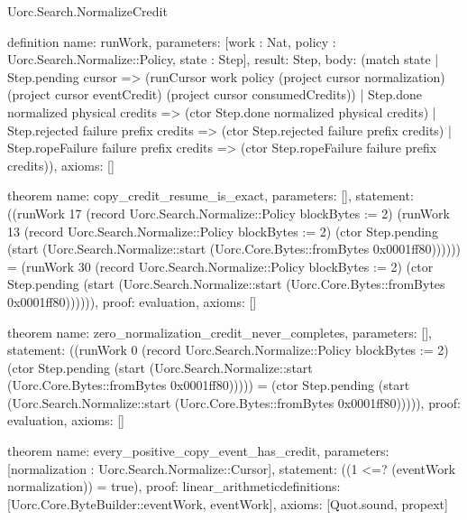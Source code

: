 \begin{lexlean}{Uorc.Search.NormalizeCredit}
\begin{semanticmodule}
definition{
  name: runWork,
  parameters: [work : Nat, policy : Uorc.Search.Normalize::Policy, state : Step],
  result: Step,
  body: (match state
    | Step.pending cursor => (runCursor work policy (project cursor normalization) (project cursor eventCredit) (project cursor consumedCredits))
    | Step.done normalized physical credits => (ctor Step.done normalized physical credits)
    | Step.rejected failure prefix credits => (ctor Step.rejected failure prefix credits)
    | Step.ropeFailure failure prefix credits => (ctor Step.ropeFailure failure prefix credits)),
  axioms: []
}

theorem{
  name: copy_credit_resume_is_exact,
  parameters: [],
  statement: ((runWork 17 (record Uorc.Search.Normalize::Policy {blockBytes := 2}) (runWork 13 (record Uorc.Search.Normalize::Policy {blockBytes := 2}) (ctor Step.pending (start (Uorc.Search.Normalize::start (Uorc.Core.Bytes::fromBytes 0x0001ff80)))))) = (runWork 30 (record Uorc.Search.Normalize::Policy {blockBytes := 2}) (ctor Step.pending (start (Uorc.Search.Normalize::start (Uorc.Core.Bytes::fromBytes 0x0001ff80)))))),
  proof: evaluation{},
  axioms: []
}

theorem{
  name: zero_normalization_credit_never_completes,
  parameters: [],
  statement: ((runWork 0 (record Uorc.Search.Normalize::Policy {blockBytes := 2}) (ctor Step.pending (start (Uorc.Search.Normalize::start (Uorc.Core.Bytes::fromBytes 0x0001ff80))))) = (ctor Step.pending (start (Uorc.Search.Normalize::start (Uorc.Core.Bytes::fromBytes 0x0001ff80))))),
  proof: evaluation{},
  axioms: []
}

theorem{
  name: every_positive_copy_event_has_credit,
  parameters: [normalization : Uorc.Search.Normalize::Cursor],
  statement: ((1 <=? (eventWork normalization)) = true),
  proof: linear_arithmetic{definitions: [Uorc.Core.ByteBuilder::eventWork, eventWork]},
  axioms: [Quot.sound, propext]
}
\end{semanticmodule}
\end{lexlean}
